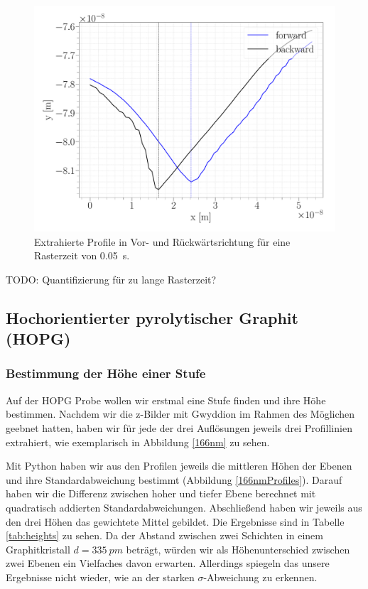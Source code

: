 \begin{figure}[H]
\centering
\includegraphics[width=\textwidth]{../Figures/TIME_005_profile.pdf}
\caption{Extrahierte Profile in Vor- und Rückwärtsrichtung für eine Rasterzeit von \SI{0.05}{s}.}
\label{TIME_005_profile}
\end{figure}


TODO: Quantifizierung für zu lange Rasterzeit?


\subsection{Hochorientierter pyrolytischer Graphit (HOPG)}
\subsubsection{Bestimmung der Höhe einer Stufe}

Auf der HOPG Probe wollen wir erstmal eine Stufe finden und ihre Höhe bestimmen. Nachdem wir die z-Bilder mit Gwyddion im Rahmen des Möglichen geebnet hatten, haben wir für jede der drei Auflösungen jeweils drei Profillinien extrahiert, wie exemplarisch in Abbildung \ref{166nm} zu sehen.

Mit Python haben wir aus den Profilen jeweils die mittleren Höhen der Ebenen und ihre Standardabweichung bestimmt (Abbildung \ref{166nmProfiles}). Darauf haben wir die Differenz zwischen hoher und tiefer Ebene berechnet mit quadratisch addierten Standardabweichungen. Abschließend haben wir jeweils aus den drei Höhen das gewichtete Mittel gebildet. Die Ergebnisse sind in Tabelle \ref{tab:heights} zu sehen. Da der Abstand zwischen zwei Schichten in einem Graphitkristall $d = \SI{335}{pm}$ beträgt, würden wir als Höhenunterschied zwischen zwei Ebenen ein Vielfaches davon erwarten. Allerdings spiegeln das unsere Ergebnisse nicht wieder, wie an der starken $\sigma$-Abweichung zu erkennen.

